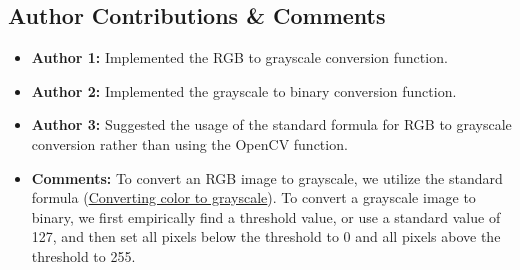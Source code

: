 \documentclass[11pt,a4paper]{article}
\begin{document}
\subsection*{Author Contributions \& Comments}
\begin{itemize}[itemsep=-1ex, topsep=0pt, leftmargin=1em]
    \color{RoyalBlue}\item \textbf{Author 1:} \color{black}{--} Implemented the RGB to grayscale conversion function.
          \color{RoyalBlue}\item \textbf{Author 2:} \color{black}{--} Implemented the grayscale to binary conversion function.
          \color{RoyalBlue}\item \textbf{Author 3:} \color{black}{--} Suggested the usage of the standard formula for RGB to grayscale conversion rather than using the OpenCV function.
    \item \textbf{Comments:} To convert an RGB image to grayscale, we utilize the standard formula (\href{https://en.wikipedia.org/wiki/#Converting_color_to_grayscale}{Converting color to grayscale}). To convert a grayscale image to binary, we first empirically find a threshold value, or use a standard value of 127, and then set all pixels below the threshold to 0 and all pixels above the threshold to 255.
\end{itemize}
\end{document}
